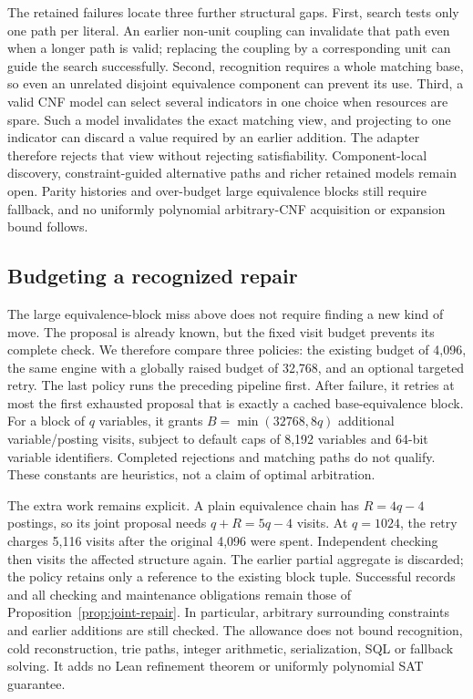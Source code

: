 \documentclass[11pt,a4paper]{article}
\numberwithin{equation}{section}
\theoremstyle{plain}
\theoremstyle{definition}
\theoremstyle{remark}
\begin{document}
The retained failures locate three further structural gaps. First, search tests only one path per literal. An earlier non-unit coupling can invalidate that path even when a longer path is valid; replacing the coupling by a corresponding unit can guide the search successfully. Second, recognition requires a whole matching base, so even an unrelated disjoint equivalence component can prevent its use. Third, a valid CNF model can select several indicators in one choice when resources are spare. Such a model invalidates the exact matching view, and projecting to one indicator can discard a value required by an earlier addition. The adapter therefore rejects that view without rejecting satisfiability. Component-local discovery, constraint-guided alternative paths and richer retained models remain open. Parity histories and over-budget large equivalence blocks still require fallback, and no uniformly polynomial arbitrary-CNF acquisition or expansion bound follows.

\subsection{Budgeting a recognized repair}
\label{sec:budgeted-repair}

The large equivalence-block miss above does not require finding a new kind of move. The proposal is already known, but the fixed visit budget prevents its complete check. We therefore compare three policies: the existing budget of 4,096, the same engine with a globally raised budget of 32,768, and an optional targeted retry. The last policy runs the preceding pipeline first. After failure, it retries at most the first exhausted proposal that is exactly a cached base-equivalence block. For a block of $q$ variables, it grants $B=\min(32768,8q)$ additional variable/posting visits, subject to default caps of 8,192 variables and 64-bit variable identifiers. Completed rejections and matching paths do not qualify. These constants are heuristics, not a claim of optimal arbitration.

The extra work remains explicit. A plain equivalence chain has $R=4q-4$ postings, so its joint proposal needs $q+R=5q-4$ visits. At $q=1024$, the retry charges 5,116 visits after the original 4,096 were spent. Independent checking then visits the affected structure again. The earlier partial aggregate is discarded; the policy retains only a reference to the existing block tuple. Successful records and all checking and maintenance obligations remain those of Proposition~\ref{prop:joint-repair}. In particular, arbitrary surrounding constraints and earlier additions are still checked. The allowance does not bound recognition, cold reconstruction, trie paths, integer arithmetic, serialization, SQL or fallback solving. It adds no Lean refinement theorem or uniformly polynomial SAT guarantee.
\end{document}
